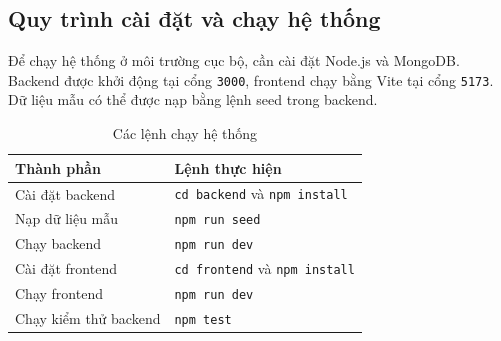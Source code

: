\documentclass[../main.tex]{subfiles}
\begin{document}
\subsection{Quy trình cài đặt và chạy hệ thống}

Để chạy hệ thống ở môi trường cục bộ, cần cài đặt Node.js và MongoDB. Backend được khởi động tại cổng \texttt{3000}, frontend chạy bằng Vite tại cổng \texttt{5173}. Dữ liệu mẫu có thể được nạp bằng lệnh seed trong backend.

\begin{table}[H]
\centering
\caption{Các lệnh chạy hệ thống}
\begin{tabularx}{\textwidth}{|p{4cm}|X|}
\hline
\textbf{Thành phần} & \textbf{Lệnh thực hiện} \\
\hline
Cài đặt backend & \texttt{cd backend} và \texttt{npm install} \\
\hline
Nạp dữ liệu mẫu & \texttt{npm run seed} \\
\hline
Chạy backend & \texttt{npm run dev} \\
\hline
Cài đặt frontend & \texttt{cd frontend} và \texttt{npm install} \\
\hline
Chạy frontend & \texttt{npm run dev} \\
\hline
Chạy kiểm thử backend & \texttt{npm test} \\
\hline
\end{tabularx}
\end{table}
\end{document}
